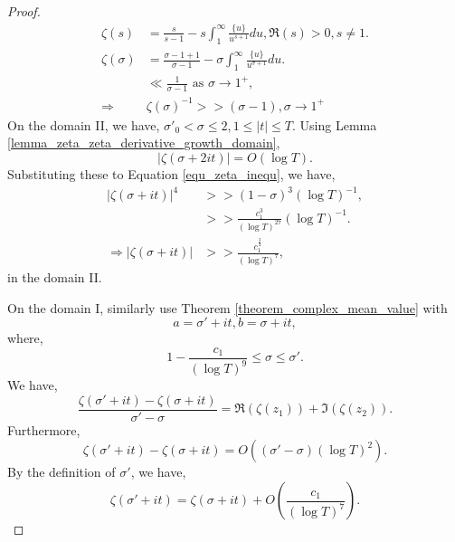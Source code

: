 \documentclass{article}
\begin{document}
\begin{proof}
    \begin{align*}
      \zeta(s) & = {\frac s {s-1}}-s\int_1^\infty {\frac {\{u\}} {u^{s+1}}}du, \Re(s)>0, s\not =1.\\
      \zeta(\sigma) & = {\frac {\sigma-1+1} {\sigma-1}} - \sigma\int_1^\infty {\frac {\{u\}} {u^{\sigma+1}}}du.\\
      & \ll  {\frac 1 {\sigma -1}}\text{ as } \sigma\to 1^+,\\
      \Rightarrow & \zeta(\sigma)^{-1}>>(\sigma-1), \sigma\to 1^{+}
    \end{align*}
    On the domain II, we have, $\sigma'_0<\sigma\leq 2,1\leq \vert t\vert\leq T$. Using Lemma \ref{lemma_zeta_zeta_derivative_growth_domain},
    \begin{equation*}
      \vert\zeta(\sigma+2it)\vert  = O(\log T).
    \end{equation*}
    Substituting these to Equation \eqref{equ_zeta_inequ}, we have,
    \begin{align*}
      \vert \zeta(\sigma+it)\vert^4&>>(1-\sigma)^3(\log T)^{-1},\\
      &>>{\frac {c_1^3} {(\log T)^{27}}}(\log T)^{-1}.\\
      \Rightarrow \vert \zeta(\sigma+it)\vert & >> {\frac {c_1^{{\frac 3 4}}} {(\log T)^7}}\tag{$D1$}\label{eq_ineq_domain_2},
    \end{align*}
    in the domain II.
    \par On the domain I, similarly use Theorem \ref{theorem_complex_mean_value} with 
    \begin{equation*}
      a = \sigma'+it,b=\sigma+it,
    \end{equation*}
    where,
    \begin{equation*}
      1-{\frac {c_1} {(\log T)^9}}\leq \sigma\leq \sigma'.
    \end{equation*}
    We have,
    \begin{equation*}
      {\frac {\zeta(\sigma'+it)-\zeta(\sigma+it)} {\sigma'-\sigma}} = \Re(\zeta(z_1))+\Im(\zeta(z_2)).
    \end{equation*}
    Furthermore,
    \begin{equation*}
      \zeta(\sigma'+it)-\zeta(\sigma+it) = O((\sigma'-\sigma)(\log T)^2).
    \end{equation*}
    By the definition of $\sigma'$, we have,
    \begin{equation*}
      \zeta(\sigma'+it) = \zeta(\sigma+it)+O\left({\frac {c_1} {(\log T)^7}}\right).\tag{$D2$}\label{eq_ineq_domain_1}
    \end{equation*}

\end{proof}
\end{document}
